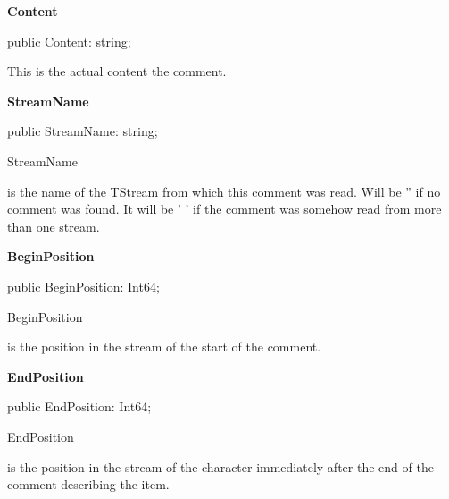 \documentclass{report}
\newif\ifpdf
\begin{document}
\begin{list}{}{
\setlength{\itemindent}{0cm}
\setlength{\listparindent}{0cm}
\setlength{\leftmargin}{\evensidemargin}
\addtolength{\leftmargin}{\tmplength}
\settowidth{\labelsep}{X}
\addtolength{\leftmargin}{\labelsep}
\setlength{\labelwidth}{\tmplength}
}
\label{PasDoc_Items.TRawDescriptionInfo-Content}
\item[\textbf{Content}\hfill]
\ifpdf
\begin{flushleft}
\fi
\begin{ttfamily}
public Content: string;\end{ttfamily}

\ifpdf
\end{flushleft}
\fi


\par This is the actual content the comment.\label{PasDoc_Items.TRawDescriptionInfo-StreamName}
\item[\textbf{StreamName}\hfill]
\ifpdf
\begin{flushleft}
\fi
\begin{ttfamily}
public StreamName: string;\end{ttfamily}

\ifpdf
\end{flushleft}
\fi


\par \begin{ttfamily}StreamName\end{ttfamily} is the name of the TStream from which this comment was read. Will be '' if no comment was found. It will be ' ' if the comment was somehow read from more than one stream.\label{PasDoc_Items.TRawDescriptionInfo-BeginPosition}
\item[\textbf{BeginPosition}\hfill]
\ifpdf
\begin{flushleft}
\fi
\begin{ttfamily}
public BeginPosition: Int64;\end{ttfamily}

\ifpdf
\end{flushleft}
\fi


\par \begin{ttfamily}BeginPosition\end{ttfamily} is the position in the stream of the start of the comment.\label{PasDoc_Items.TRawDescriptionInfo-EndPosition}
\item[\textbf{EndPosition}\hfill]
\ifpdf
\begin{flushleft}
\fi
\begin{ttfamily}
public EndPosition: Int64;\end{ttfamily}

\ifpdf
\end{flushleft}
\fi


\par \begin{ttfamily}EndPosition\end{ttfamily} is the position in the stream of the character immediately after the end of the comment describing the item.\end{list}
\ifpdf
\end{document}

